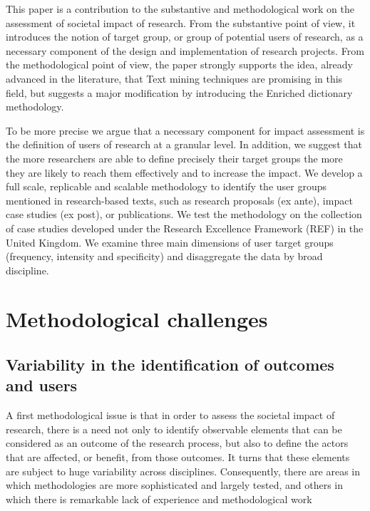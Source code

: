 \documentclass[]{book}
\theoremstyle{definition}
\theoremstyle{definition}
\theoremstyle{definition}
\theoremstyle{remark}
\begin{document}
This paper is a contribution to the substantive and methodological work
on the assessment of societal impact of research. From the substantive
point of view, it introduces the notion of target group, or group of
potential users of research, as a necessary component of the design and
implementation of research projects. From the methodological point of
view, the paper strongly supports the idea, already advanced in the
literature, that Text mining techniques are promising in this field, but
suggests a major modification by introducing the Enriched dictionary
methodology.

To be more precise we argue that a necessary component for impact
assessment is the definition of users of research at a granular level.
In addition, we suggest that the more researchers are able to define
precisely their target groups the more they are likely to reach them
effectively and to increase the impact. We develop a full scale,
replicable and scalable methodology to identify the user groups
mentioned in research-based texts, such as research proposals (ex ante),
impact case studies (ex post), or publications. We test the methodology
on the collection of case studies developed under the Research
Excellence Framework (REF) in the United Kingdom. We examine three main
dimensions of user target groups (frequency, intensity and specificity)
and disaggregate the data by broad discipline.

\section{Methodological challenges}\label{methodological-challenges}

\subsection{Variability in the identification of outcomes and
users}\label{variability-in-the-identification-of-outcomes-and-users}

A first methodological issue is that in order to assess the societal
impact of research, there is a need not only to identify observable
elements that can be considered as an outcome of the research process,
but also to define the actors that are affected, or benefit, from those
outcomes. It turns that these elements are subject to huge variability
across disciplines. Consequently, there are areas in which methodologies
are more sophisticated and largely tested, and others in which there is
remarkable lack of experience and methodological work
\citep[\citet{cturcan2015national}]{stern2013long, mitton2007knowledge}
\end{document}
